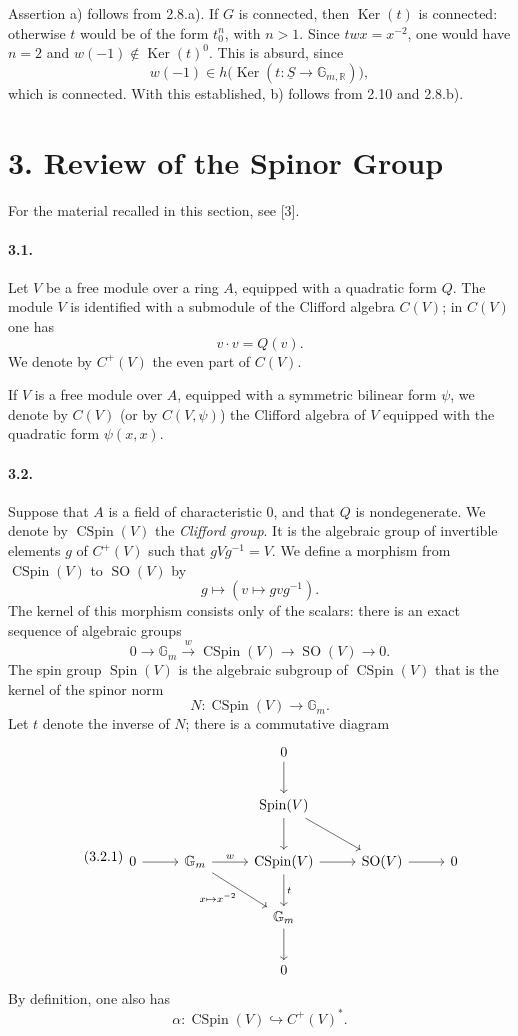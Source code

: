 \documentclass[10pt,leqno]{article}
\newcommand{\R}{\mathbb{R}}
\newcommand{\Gm}{\mathbb{G}_m}
\newcommand{\SO}{\operatorname{SO}}
\newcommand{\Spin}{\operatorname{Spin}}
\newcommand{\CSpin}{\operatorname{CSpin}}
\newcommand{\Ker}{\operatorname{Ker}}
\newcommand{\into}{\hookrightarrow}
\begin{document}
Assertion a) follows from 2.8.a). If $G$ is connected, then $\Ker(t)$ is connected: otherwise $t$ would be of the form $t_0^n$, with $n>1$. Since $twx=x^{-2}$, one would have $n=2$ and $w(-1)\notin\Ker(t)^0$. This is absurd, since
\[
w(-1)\in h\bigl(\Ker(t:\underline S\longrightarrow\mathbb G_{m,\R})\bigr),
\]
which is connected. With this established, b) follows from 2.10 and 2.8.b).

\section*{3. Review of the Spinor Group}

For the material recalled in this section, see [3].

\paragraph{3.1.} Let $V$ be a free module over a ring $A$, equipped with a quadratic form $Q$. The module $V$ is identified with a submodule of the Clifford algebra $C(V)$; in $C(V)$ one has
\[
v\cdot v=Q(v).
\]
We denote by $C^+(V)$ the even part of $C(V)$.

\clearpage

If $V$ is a free module over $A$, equipped with a symmetric bilinear form $\psi$, we denote by $C(V)$ (or by $C(V,\psi)$) the Clifford algebra of $V$ equipped with the quadratic form $\psi(x,x)$.

\paragraph{3.2.} Suppose that $A$ is a field of characteristic $0$, and that $Q$ is nondegenerate. We denote by $\CSpin(V)$ the \emph{Clifford group}. It is the algebraic group of invertible elements $g$ of $C^+(V)$ such that $gVg^{-1}=V$. We define a morphism from $\CSpin(V)$ to $\SO(V)$ by
\[
g\longmapsto (v\longmapsto gvg^{-1}).
\]
The kernel of this morphism consists only of the scalars: there is an exact sequence of algebraic groups
\[
0\longrightarrow\Gm\xrightarrow{\ w\ }\CSpin(V)\longrightarrow\SO(V)\longrightarrow0.
\]
The spin group $\Spin(V)$ is the algebraic subgroup of $\CSpin(V)$ that is the kernel of the spinor norm
\[
N:\CSpin(V)\longrightarrow\Gm.
\]
Let $t$ denote the inverse of $N$; there is a commutative diagram
\[
\tag{3.2.1}
\begin{tikzcd}[column sep=2.6em,row sep=2.3em]
& & 0 \arrow[d] & & \\
& & \Spin(V) \arrow[d] \arrow[dr] & & \\
0 \arrow[r] & \Gm \arrow[r,"w"] \arrow[dr,"x\mapsto x^{-2}"'] & \CSpin(V) \arrow[r] \arrow[d,"t"] & \SO(V) \arrow[r] & 0\\
& & \Gm \arrow[d] & & \\
& & 0 & &
\end{tikzcd}
\]
By definition, one also has
\[
\tag{3.2.2}
\alpha:\CSpin(V)\into C^+(V)^*.
\]
\end{document}
